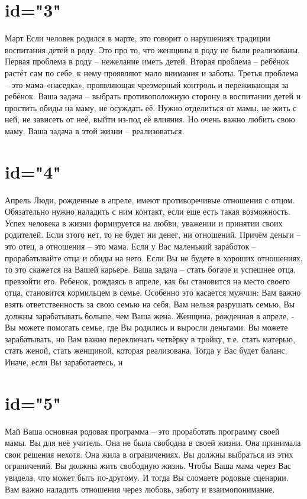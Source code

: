 \section{id="3"}{Март}
Если человек родился в марте, это говорит о нарушениях традиции 
воспитания детей в роду.
Это про то, что женщины в роду не были реализованы. 
Первая проблема в роду – нежелание иметь детей. 
Вторая проблема – ребёнок растёт сам по себе, к нему проявляют 
мало внимания и заботы. 
Третья проблема – это мама-«наседка», проявляющая чрезмерный 
контроль и переживающая за ребёнок. 
Ваша задача – выбрать противоположную сторону в воспитании детей 
и простить обиды на маму, не осуждать её. Нужно отделиться от мамы, 
не жить с ней, не зависеть от неё, выйти из-под её влияния. Но очень 
важно любить свою маму.
Ваша задача в этой жизни – реализоваться.
\endsection

\section{id="4"}{Апрель}
Люди, рожденные в апреле, имеют противоречивые отношения с отцом. 
Обязательно нужно наладить с ним контакт, если еще есть такая 
возможность. Успех человека в жизни формируется на любви, уважении 
и принятии своих родителей. Если этого нет, то не будет ни денег, 
ни отношений. Причём деньги – это отец, а отношения – это мама. 
Если у Вас маленький заработок – прорабатывайте отца и обиды на него. 
Если Вы не будете в хороших отношениях, то это скажется на Вашей карьере. 
Ваша задача – стать богаче и успешнее отца, превзойти его.
Ребенок, рождаясь в апреле, как бы становится на место своего отца, 
становится кормильцем в семье. Особенно это касается мужчин: Вам важно 
взять ответственность за свою семью на себя, Вам нельзя разрушать семью, 
Вы должны зарабатывать больше, чем Ваша жена. 
Женщина, рожденная в апреле, - Вы можете помогать семье, где Вы родились 
и выросли деньгами. Вы можете зарабатывать, но Вам важно переключать 
четвёрку в тройку, т.е. стать матерью, стать женой, стать женщиной, 
которая реализована. Тогда у Вас будет баланс. Иначе, если Вы заработаетесь, и
\endsection

\section{id="5"}{Май}
Ваша основная родовая программа – это проработать программу своей мамы. 
Вы для неё учитель. Она не была свободна в своей жизни. Она принимала 
свои решения нехотя. Она жила в ограничениях. Вы должны выбраться из 
этих ограничений. Вы должны жить свободную жизнь. Чтобы Ваша мама через 
Вас увидела, что может быть по-другому. И тогда Вы сломаете родовые 
сценарии. Вам важно наладить отношения через любовь, заботу и взаимопонимание.
\endsection

